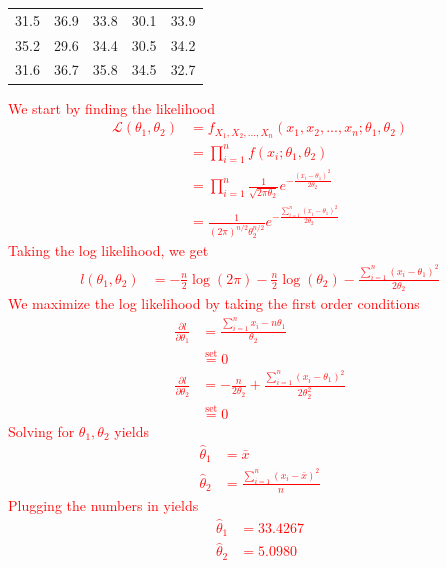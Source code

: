 \documentclass[12pt]{article} %
\begin{document}
\begin{enumerate}
\begin{center}
    \begin{tabular}{ccccc}
31.5 & 36.9 & 33.8 & 30.1 & 33.9 \\
35.2 & 29.6 & 34.4 & 30.5 & 34.2 \\
31.6 & 36.7 & 35.8 & 34.5 & 32.7 \\
\end{tabular}
\end{center}
\textcolor{red}{We start by finding the likelihood $$\begin{aligned}
    \mathcal{L}(\theta_1, \theta_2) &= f_{X_1, X_2, ..., X_n}(x_1, x_2, ..., x_n; \theta_1, \theta_2) \\
    &= \prod_{i=1}^n f(x_i; \theta_1, \theta_2) \\
    &= \prod_{i=1}^n \frac{1}{\sqrt{2\pi\theta_2}} e^{-\frac{(x_i-\theta_1)^2}{2\theta_2}} \\
    &= \frac{1}{(2\pi)^{n/2} \theta_2^{n/2}} e^{-\frac{\sum_{i=1}^n (x_i-\theta_1)^2}{2\theta_2}}
\end{aligned}$$ Taking the log likelihood, we get $$\begin{aligned}
    l(\theta_1, \theta_2) &= -\frac{n}{2} \log(2\pi) - \frac{n}{2} \log(\theta_2) - \frac{\sum_{i=1}^n(x_i-\theta_1)^2}{2 \theta_2}  
\end{aligned}$$ We maximize the log likelihood by taking the first order conditions $$\begin{aligned}
    \frac{\partial l}{\partial \theta_1} &= \frac{\sum_{i=1}^n x_i - n\theta_1}{\theta_2} \\
    &\overset{\mathrm{set}}{=} 0 \\
    \frac{\partial l}{\partial \theta_2} &= -\frac{n}{2\theta_2} + \frac{\sum_{i=1}^n (x_i-\theta_1)^2}{2 \theta_2^2} \\
    &\overset{\mathrm{set}}{=} 0
\end{aligned}$$ Solving for $\theta_1, \theta_2$ yields $$\begin{aligned}
    \hat \theta_1 &= \bar{x} \\
    \hat \theta_2 &= \frac{\sum_{i=1}^n (x_i-\bar{x})^2}{n}
\end{aligned}$$ Plugging the numbers in yields $$\begin{aligned}
    \hat \theta_1 &= 33.4267 \\
    \hat \theta_2 &= 5.0980
\end{aligned}$$}

\end{enumerate}
\end{document}
